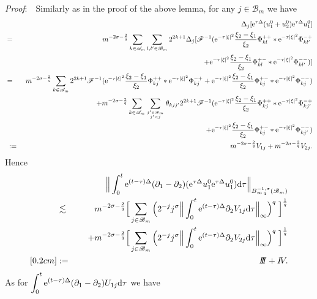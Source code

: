 \documentclass[11pt]{article}
\newcommand{\rmd}{\mbox{\rm d}}
\newcommand{\rme}{{\rm e}}
\begin{document}
  {\em Proof}:\ \ Similarly as in the proof of the above lemma, for any $j\in\mathscr{B}_m$ we have
\begin{eqnarray*}
  &&\Delta_j[\rme^{\tau\Delta}(u_1^0+u_2^0)\rme^{\tau\Delta}u_1^0]
\\
  &= & m^{-2\sigma-\frac{2}{q}}\sum_{k\in\mathscr{A}_m}\sum_{l,l'\in\mathscr{B}_m}2^{2k+1}
  \Delta_j[\mathscr{F}^{-1}(\rme^{-\tau|\xi|^2}\frac{\xi_2-\xi_1}{\xi_2}\Phi_{kl}^{++}\ast\rme^{-\tau|\xi|^2}\Phi_{kl'}^{-+}
\\
  && \qquad\qquad\qquad\qquad\qquad\qquad\quad +\rme^{-\tau|\xi|^2}\frac{\xi_2-\xi_1}{\xi_2}\Phi_{kl}^{+-}\ast\rme^{-\tau|\xi|^2}\Phi_{kl'}^{--})]
\\
  &= & m^{-2\sigma-\frac{2}{q}}\sum_{k\in\mathscr{A}_m}2^{2k+1}\mathscr{F}^{-1}
  (\rme^{-\tau|\xi|^2}\frac{\xi_2-\xi_1}{\xi_2}\Phi_{kj}^{++}\ast\rme^{-\tau|\xi|^2}\Phi_{kj}^{-+}
  +\rme^{-\tau|\xi|^2}\frac{\xi_2-\xi_1}{\xi_2}\Phi_{kj}^{+-}\ast\rme^{-\tau|\xi|^2}\Phi_{kj}^{--})
\\
  && +m^{-2\sigma-\frac{2}{q}}\sum_{k\in\mathscr{A}_m}\sum_{{j'\in\mathscr{B}_m\atop j'<j}}\theta_{kjj'}2^{2k+1}
  \mathscr{F}^{-1}(\rme^{-\tau|\xi|^2}\frac{\xi_2-\xi_1}{\xi_2}\Phi_{kj}^{++}\ast\rme^{-\tau|\xi|^2}\Phi_{kj'}^{-+}
\\
  && \qquad\qquad\qquad\qquad\qquad\qquad\qquad +\rme^{-\tau|\xi|^2}\frac{\xi_2-\xi_1}{\xi_2}\Phi_{kj}^{+-}\ast\rme^{-\tau|\xi|^2}\Phi_{kj'}^{--})
\\
  &\;:=\; & m^{-2\sigma-\frac{2}{q}}V_{1j}+m^{-2\sigma-\frac{2}{q}}V_{2j}.
\end{eqnarray*}
  Hence
\begin{eqnarray}
  &&\Big\|\int_0^t\rme^{(t-\tau)\Delta}(\partial_1-\partial_2)(\rme^{\tau\Delta}u_1^0\rme^{\tau\Delta}u_1^0)\rmd\tau
  \Big\|_{B^{-1,\sigma}_{\infty\,q}(\mathscr{B}_m)}
\nonumber\\
  &\lesssim\; &m^{-2\sigma-\frac{2}{q}}\Big[\sum_{j\in\mathscr{B}_m}\Big(2^{-j}j^{\sigma}\Big\|\int_0^t\rme^{(t-\tau)\Delta}
  \partial_2V_{1j}\rmd\tau\Big\|_{\infty}\Big)^q\;\Big]^{\frac{1}{q}}
\nonumber\\
  &&\quad +m^{-2\sigma-\frac{2}{q}}\Big[\sum_{j\in\mathscr{B}_m}\Big(2^{-j}j^{\sigma}\Big\|\int_0^t\rme^{(t-\tau)\Delta}
  \partial_2V_{2j}\rmd\tau\Big\|_{\infty}\Big)^q\;\Big]^{\frac{1}{q}}
\nonumber\\ [0.2cm]
  &:=\; &I\!\!I\!\!I+I\!V.
\end{eqnarray}
  As for $\displaystyle\int_0^t\rme^{(t-\tau)\Delta}(\partial_1-\partial_2)U_{1j}\rmd\tau$ we have
\end{document}
